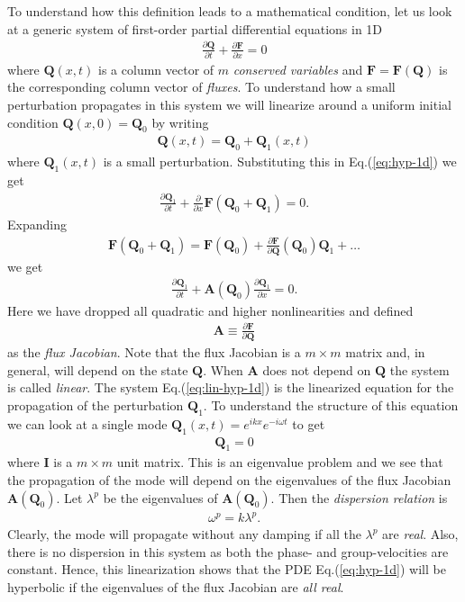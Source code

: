 \documentclass[12pt]{article}
\theoremstyle{definition}
\theoremstyle{definition}
\theoremstyle{definition}
\newcommand{\eqr}[1]{Eq.\thinspace(#1)}
\newcommand{\pfrac}[2]{\frac{\partial #1}{\partial #2}}
\newcommand{\mvec}[1]{\mathbf{#1}}
\begin{document}
To understand how this definition leads to a mathematical condition,
let us look at a generic system of first-order partial differential
equations in 1D
\begin{align}
  \pfrac{\mvec{Q}}{t} + \pfrac{\mvec{F}}{x} = 0
  \label{eq:hyp-1d}
\end{align}
where $\mvec{Q}(x,t)$ is a column vector of $m$ \emph{conserved
  variables} and $\mvec{F} = \mvec{F}(\mvec{Q})$ is the corresponding
column vector of \emph{fluxes}. To understand how a small perturbation
propagates in this system we will linearize around a uniform initial
condition $\mvec{Q}(x,0) = \mvec{Q}_0$ by writing
\begin{align}
  \mvec{Q}(x,t) = \mvec{Q}_0 + \mvec{Q}_1(x,t)
\end{align}
where $\mvec{Q}_1(x,t)$ is a small perturbation. Substituting this in
\eqr{\ref{eq:hyp-1d}} we get
\begin{align}
  \pfrac{\mvec{Q}_1}{t} + 
  \frac{\partial}{\partial x} \mvec{F}(\mvec{Q}_0 + \mvec{Q}_1)
  =
  0.
\end{align}
Expanding
\begin{align}
  \mvec{F}(\mvec{Q}_0 + \mvec{Q}_1)
  =
  \mvec{F}(\mvec{Q}_0) + \pfrac{\mvec{F}}{\mvec{Q}}(\mvec{Q}_0)
  \mvec{Q}_1
  + \ldots
\end{align}
we get
\begin{align}
  \pfrac{\mvec{Q}_1}{t} + 
  \mvec{A}(\mvec{Q}_0)
  \pfrac{\mvec{Q}_1}{x}
  =
  0.
  \label{eq:lin-hyp-1d}
\end{align}
Here we have dropped all quadratic and higher nonlinearities and
defined
\begin{align}
  \mvec{A} \equiv \pfrac{\mvec{F}}{\mvec{Q}}
\end{align}
as the \emph{flux Jacobian}. Note that the flux Jacobian is a
$m\times m$ matrix and, in general, will depend on the state
$\mvec{Q}$. When $\mvec{A}$ does not depend on $\mvec{Q}$ the system
is called \emph{linear}. The system \eqr{\ref{eq:lin-hyp-1d}} is the
linearized equation for the propagation of the perturbation
$\mvec{Q}_1$. To understand the structure of this equation we can look
at a single mode $\mvec{Q}_1(x,t) = e^{ikx} e^{-i\omega t}$ to get
\begin{align}
  [k \mvec{A}(\mvec{Q}_0) -  \omega\mvec{I}] \mvec{Q}_1 = 0
\end{align}
where $\mvec{I}$ is a $m \times m$ unit matrix. This is an eigenvalue
problem and we see that the propagation of the mode will depend on the
eigenvalues of the flux Jacobian $\mvec{A}(\mvec{Q}_0)$. Let
$\lambda^p$ be the eigenvalues of $\mvec{A}(\mvec{Q}_0)$. Then the
\emph{dispersion relation} is
\begin{align}
  \omega^p = k \lambda^p.
\end{align}
Clearly, the mode will propagate without any damping if all the
$\lambda^p$ are \emph{real}. Also, there is no dispersion in this
system as both the phase- and group-velocities are constant. Hence,
this linearization shows that the PDE \eqr{\ref{eq:hyp-1d}} will be
hyperbolic if the eigenvalues of the flux Jacobian are \emph{all
  real}.
\end{document}

